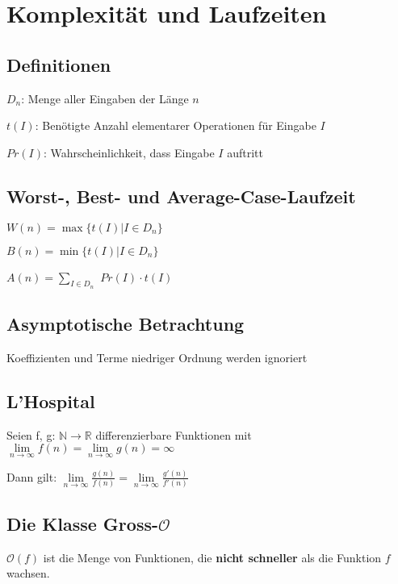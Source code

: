 \documentclass[12pt]{article}
\begin{document}
\parindent=0pt

\tableofcontents
\clearpage
{}

\section{Komplexität und Laufzeiten}

\subsection{Definitionen}
$D_n$: Menge aller Eingaben der Länge $n$

$t(I)$: Benötigte Anzahl elementarer Operationen für Eingabe $I$

$Pr(I)$: Wahrscheinlichkeit, dass Eingabe $I$ auftritt

\subsection{Worst-, Best- und Average-Case-Laufzeit}

$W(n) = \max\{ t(I) | I \in D_n \}$

$B(n) = \min\{ t(I) | I \in D_n \}$

$A(n) = \sum_{I \in D_{n}}$ $Pr(I) \cdot{} t(I)$

\subsection{Asymptotische Betrachtung}

Koeffizienten und Terme niedriger Ordnung werden ignoriert

\subsection{L'Hospital}

Seien f, g: $\mathbb{N} \to \mathbb{R}$ differenzierbare Funktionen mit \(\lim\limits_{n \to \infty}f(n)=\lim\limits_{n \to \infty}g(n)=\infty\)

Dann gilt: \(\lim\limits_{n \to \infty}\frac{g(n)}{f(n)}=\lim\limits_{n \to \infty}\frac{g'(n)}{f'(n)}\)

\subsection{Die Klasse Gross-$\mathcal O$}

$\mathcal O(f)$ ist die Menge von Funktionen, die \textbf{nicht schneller} als die Funktion $f$ wachsen.
\end{document}
